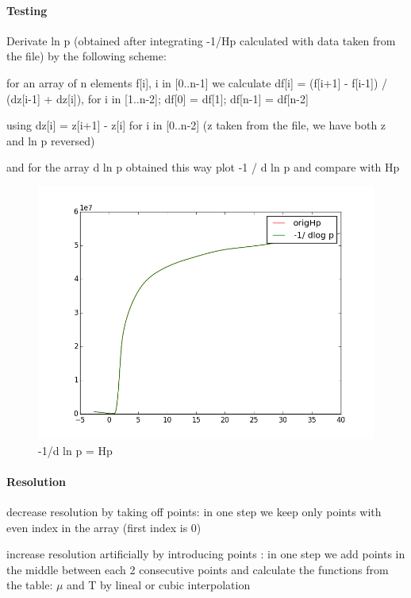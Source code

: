 \documentclass[10pt]{book}
\begin{document}
\paragraph{Testing}

Derivate ln p (obtained after integrating -1/Hp calculated with data taken from the file) by the following scheme:

for an array of n elements f[i], i in [0..n-1]
we calculate
df[i] = (f[i+1] - f[i-1]) / (dz[i-1] + dz[i]), for i in [1..n-2];
df[0] = df[1];
df[n-1] = df[n-2]

using dz[i] = z[i+1] - z[i] for i in [0..n-2]  (z taken from the file, we have both z and ln p reversed)

and for the array  d ln p obtained this way plot -1 / d ln p and compare with Hp

\begin{figure}[H]
 \centering
 \includegraphics[scale=0.5]{fromFilePyTest.png}
 \caption{-1/d ln p = Hp}
\end{figure}


\paragraph{Resolution}

decrease resolution by taking off points: in one step we keep only points with even index in the array (first index is 0)

increase resolution artificially  by introducing points : in one step we add points in the middle between each 2 consecutive points and calculate
the functions from the table: $\mu$ and T by lineal or cubic interpolation
\end{document}
